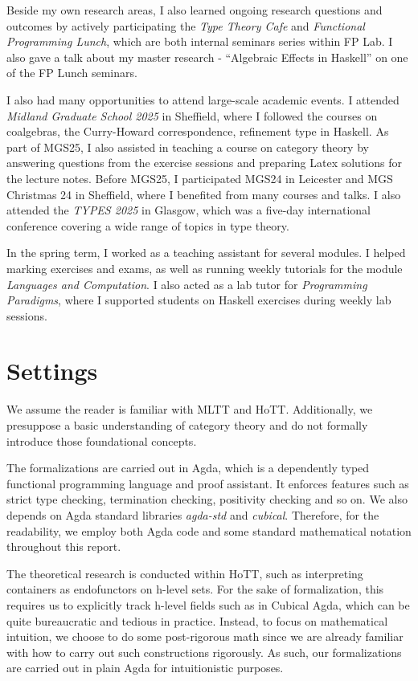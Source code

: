 Beside my own research areas, I also learned ongoing research questions and outcomes by actively participating the \textit{Type Theory Cafe} and \textit{Functional Programming Lunch}, which are both internal seminars series within FP Lab. I also gave a talk about my master research - ``Algebraic Effects in Haskell'' on one of the FP Lunch seminars.

I also had many opportunities to attend large-scale academic events. I attended \textit{Midland Graduate School 2025} in Sheffield, where I followed the courses on coalgebras, the Curry-Howard correspondence, refinement type in Haskell. As part of MGS25, I also assisted in teaching a course on category theory by answering questions from the exercise sessions and preparing Latex solutions for the lecture notes. Before MGS25, I participated MGS24 in Leicester and MGS Christmas 24 in Sheffield, where I benefited from many courses and talks. I also attended the \textit{TYPES 2025} in Glasgow, which was a five-day international conference covering a wide range of topics in type theory.

In the spring term, I worked as a teaching assistant for several modules. I helped marking exercises and exams, as well as running weekly tutorials for the module \textit{Languages and Computation}. I also acted as a lab tutor for \textit{Programming Paradigms}, where I supported students on Haskell exercises during weekly lab sessions.

\section{Settings}

We assume the reader is familiar with MLTT and HoTT. Additionally, we presuppose a basic understanding of category theory and do not formally introduce those foundational concepts. 

The formalizations are carried out in Agda\cite{norell2007towards}, which is a dependently typed functional programming language and proof assistant. It enforces features such as strict type checking, termination checking, positivity checking and so on. We also depends on Agda standard libraries \textit{agda-std} and \textit{cubical}. Therefore, for the readability, we employ both Agda code and some standard mathematical notation throughout this report.

The theoretical research is conducted within HoTT, such as interpreting containers as endofunctors on h-level sets. For the sake of formalization, this requires us to explicitly track h-level fields such as  in Cubical Agda, which can be quite bureaucratic and tedious in practice. Instead, to focus on mathematical intuition, we choose to do some post-rigorous math since we are already familiar with how to carry out such constructions rigorously. As such, our formalizations are carried out in plain Agda for intuitionistic purposes.

